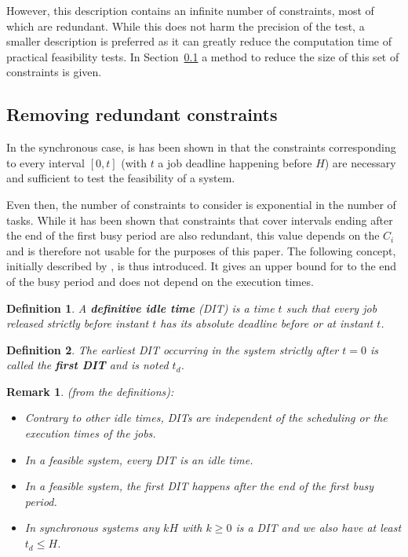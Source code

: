 \documentclass[conference]{IEEEtran}
\newtheorem{definition}{Definition}
\newtheorem{remark}{Remark}
\begin{document}
      However, this description contains an infinite number of constraints, most of
      which are redundant. While this does not harm the precision of the
      test, a smaller description is preferred as it can greatly
      reduce the computation time of practical feasibility tests. In Section~\ref{sct:removeRedundancy} a method to reduce the size of this set of constraints is given.

  \subsection{Removing redundant constraints}
    \label{sct:removeRedundancy}

  In the synchronous case, is has been shown in \cite{baruah1990algorithms} that the constraints corresponding
  to every interval $[0, t]$ (with $t$ a job deadline happening before $H$) are
  necessary and sufficient to test the feasibility of a system.

  Even then, the number of constraints to consider is exponential in the number
  of tasks. While it has been shown that constraints that cover intervals ending
  after the end of the first busy period are also redundant, this value depends on the $C_i$ and is
  therefore not usable for the purposes of this paper. The
  following concept, initially described by \cite{lipariaverage}, is thus introduced. It gives an upper bound for to the end of the busy period and does not depend on the execution times.

  \begin{definition}
    A \textbf{definitive idle time} (DIT) \cite{lipariaverage} is a time $t$ such that every job
    released strictly before instant $t$ has its absolute deadline before or at instant $t$.
  \end{definition}

  \begin{definition}
    The earliest DIT occurring in the system strictly after $t=0$ is called the
    \textbf{first DIT} and is noted $t_d$.
  \end{definition}

		\begin{remark} (from the definitions):
			\begin{itemize}
				\item Contrary to other idle times, DITs are independent of the
					scheduling or the execution times of the jobs.
				\item In a feasible system, every DIT is an idle time.
				\item In a feasible system, the first DIT happens after the end of the
					first busy period.
				\item In synchronous systems any $kH$ with $k \geqslant 0$ is a DIT and we
					also have at least $t_d \leqslant H$.
			\end{itemize}
		\end{remark}
\end{document}
